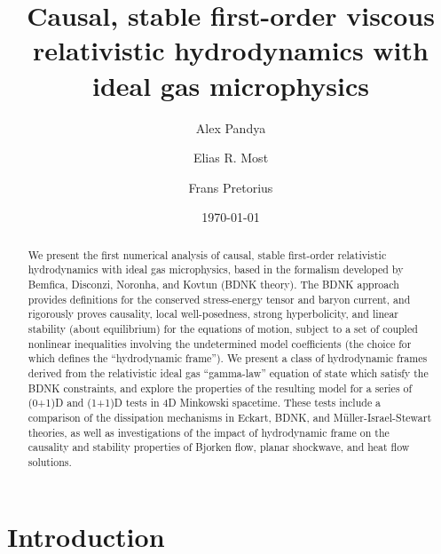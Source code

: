 \documentclass[%
notitlepage,
superscriptaddress,
nofootinbib,
amsmath,
amssymb,
aps,
twocolumn
]{revtex4-1}
\begin{document}
\title{Causal, stable first-order viscous relativistic hydrodynamics with ideal gas microphysics}

\author{Alex Pandya}
\author{Elias R. Most}
\author{Frans Pretorius}

\date{\today}

\begin{abstract}
We present the first numerical analysis of causal, stable first-order relativistic hydrodynamics
with ideal gas microphysics, based in the formalism developed by
Bemfica, Disconzi, Noronha, and Kovtun (BDNK theory).  The BDNK approach
provides definitions for the conserved stress-energy tensor and baryon
current, and rigorously proves causality, local well-posedness, strong
hyperbolicity, and linear stability (about equilibrium) for the equations
of motion, subject to a set of coupled nonlinear inequalities involving the
undetermined model coefficients (the choice for which defines the
``hydrodynamic frame'').  We present a class of hydrodynamic frames derived
from the relativistic ideal gas ``gamma-law'' equation of state which
satisfy the BDNK constraints, and explore the properties of the resulting
model for a series of (0+1)D and (1+1)D tests in 4D Minkowski spacetime.
These tests include a comparison of the dissipation mechanisms in Eckart,
BDNK, and M\"uller-Israel-Stewart theories, as well as investigations of
the impact of hydrodynamic frame on the causality and stability properties
of Bjorken flow, planar shockwave, and heat flow solutions.
\end{abstract}

\maketitle

\section{Introduction} \label{sec:introduction}
\end{document}
